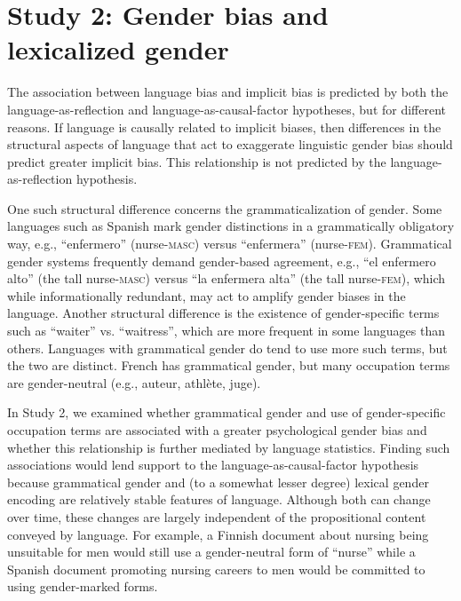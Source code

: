 \documentclass[9pt,twocolumn,twoside]{pnas-new}
\begin{document}
\section*{Study 2: Gender bias and lexicalized
gender}\label{study-2-gender-bias-and-lexicalized-gender}

The association between language bias and implicit bias is predicted by both the language-as-reflection and language-as-causal-factor hypotheses, but for different reasons. If language is causally related to implicit biases, then differences in the structural aspects of language that act to exaggerate linguistic gender bias should predict greater implicit bias. This relationship is not predicted by the language-as-reflection hypothesis.

 One such structural difference concerns the
grammaticalization of gender. Some languages such as Spanish mark gender
distinctions in a grammatically obligatory way, e.g.,
\enquote{enfermero} (nurse-\textsc{masc}) versus \enquote{enfermera}
(nurse-\textsc{fem}). Grammatical gender systems frequently demand
gender-based agreement, e.g., \enquote{el enfermero alto} (the tall
nurse-\textsc{masc}) versus \enquote{la enfermera alta} (the tall
nurse-\textsc{fem}), which while informationally redundant, may act to
amplify gender biases in the language. Another structural difference is the existence of gender-specific terms such as  \enquote{waiter} vs.
\enquote{waitress}, which are more frequent in some languages than others.  Languages with grammatical gender do tend to use
more such terms, but the two are distinct. French has grammatical
gender, but many occupation terms are gender-neutral (e.g., auteur,
athlète, juge).

In Study 2, we examined whether grammatical gender and use of
gender-specific occupation terms are associated with a greater
psychological gender bias and whether this relationship is further
mediated by language statistics. Finding such associations would lend support to the language-as-causal-factor hypothesis because grammatical gender and (to a somewhat lesser degree) lexical gender encoding are relatively stable features of language. Although both can change over time, these changes are largely independent of the propositional content conveyed by language. For example, a Finnish document about nursing being unsuitable for men would still use a gender-neutral form of
\enquote{nurse} while a Spanish document promoting nursing careers to
men would be committed to using gender-marked forms.
\end{document}
